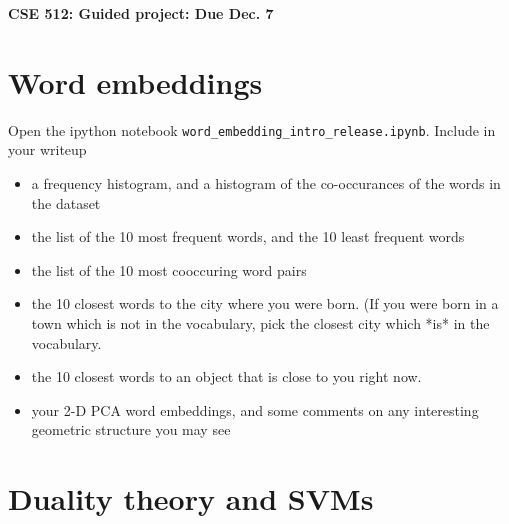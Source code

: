 \documentclass{article}
\newcommand{\mypagebreak}{\begin{center}
		\noindent\makebox[\linewidth]{\rule{7.5in}{1pt}}
	\end{center}}
\begin{document}
{\Large\textbf{CSE 512: Guided project:  \hfill
Due Dec. 7 }}


\mypagebreak



\section{Word embeddings}

Open the ipython notebook \texttt{word\_embedding\_intro\_release.ipynb}. Include in your writeup

\begin{itemize}
\item  a frequency histogram, and a histogram of the co-occurances of the words in the dataset
\item  the list of the 10 most frequent words, and the 10 least frequent words
\item  the list of the 10 most cooccuring word pairs
\item  the 10 closest words to the city where you were born. (If you were born in a town which is not in the vocabulary, pick the closest city which *is* in the vocabulary.
\item  the 10 closest words to an object that is close to you right now.
\item  your 2-D PCA word embeddings, and some comments on any interesting geometric structure you may see
\end{itemize} 


\section{Duality theory and SVMs}
\end{document}
